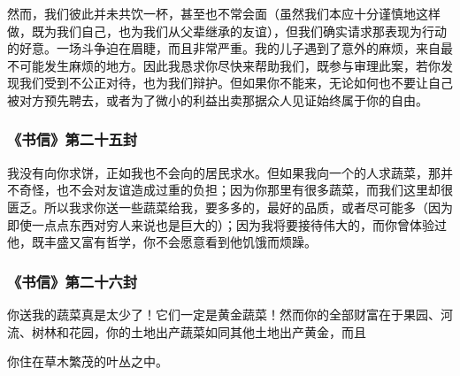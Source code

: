 \par

然而，我们彼此并未共饮一杯，甚至也不常会面（虽然我们本应十分谨慎地这样做，既为我们自己，也为我们从父辈继承的友谊），但我们确实请求那表现为行动的好意。一场斗争迫在眉睫，而且非常严重。我的儿子遇到了意外的麻烦，来自最不可能发生麻烦的地方。因此我恳求你尽快来帮助我们，既参与审理此案，若你发现我们受到不公正对待，也为我们辩护。但如果你不能来，无论如何也不要让自己被对方预先聘去，或者为了微小的利益出卖那据众人见证始终属于你的自由。\par


\subsubsection{《书信》第二十五封}

\par

我没有向你求饼，正如我也不会向的居民求水。但如果我向一个的人求蔬菜，那并不奇怪，也不会对友谊造成过重的负担；因为你那里有很多蔬菜，而我们这里却很匮乏。所以我求你送一些蔬菜给我，要多多的，最好的品质，或者尽可能多（因为即使一点点东西对穷人来说也是巨大的）；因为我将要接待伟大的，而你曾体验过他，既丰盛又富有哲学，你不会愿意看到他饥饿而烦躁。\par


\subsubsection{《书信》第二十六封}

你送我的蔬菜真是太少了！它们一定是黄金蔬菜！然而你的全部财富在于果园、河流、树林和花园，你的土地出产蔬菜如同其他土地出产黄金，而且\par

你住在草木繁茂的叶丛之中。\par

